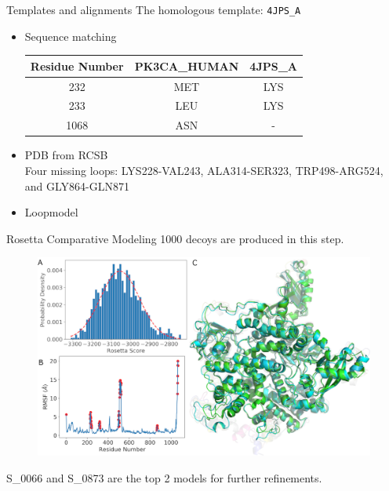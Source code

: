 \documentclass{beamer}
\begin{document}
\begin{frame}{Templates and alignments}
The homologous template: \texttt{4JPS\_A}
\begin{itemize}
\item Sequence matching  
\begin{table}[!ht]
	\centering 
	\begin{tabular}{c|cc}
		Residue Number & PK3CA\_HUMAN & 4JPS\_A \\ \hline 
		232 & MET & LYS \\ 
		233 & LEU & LYS \\ 
		1068 & ASN & - \\ 
	\end{tabular}
	\label{4jps_ali}
\end{table}
\item PDB from RCSB \\
Four missing loops: LYS228-VAL243, ALA314-SER323, TRP498-ARG524, and GLY864-GLN871 
\item Loopmodel 
\end{itemize}
\end{frame}

\begin{frame}{Rosetta Comparative Modeling}  
1000 decoys are produced in this step. 
\begin{figure}
\includegraphics[width=\linewidth]{./Figures/fig2.jpg}
\end{figure} 
S\_0066 and S\_0873 are the top 2 models for further refinements. 
\end{frame}
\end{document}
